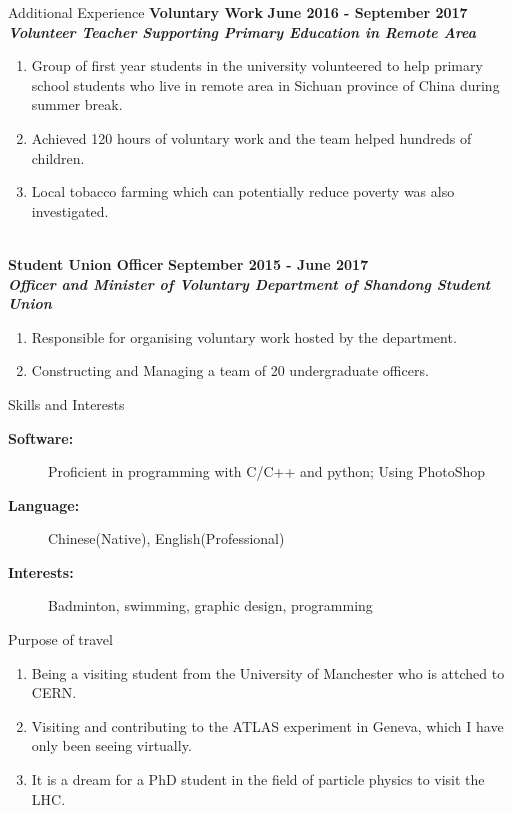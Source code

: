 \documentclass{resume} %
\begin{document}
    \begin{rSection}{Additional Experience}
        {\bf Voluntary Work} \hfill {\bf June 2016 - September 2017}\\
        {\bf \em Volunteer Teacher Supporting Primary Education in Remote Area}
        \begin{enumerate}[leftmargin=*,label=$\bullet$]
            \item   Group of first year students in the university volunteered to help primary school students who live in remote area in 
                    Sichuan province of China during summer break.
            \item   Achieved 120 hours of voluntary work and the team helped hundreds of children.
            \item   Local tobacco farming which can potentially reduce poverty was also investigated.
        \end{enumerate} 
        \ \\[0pt]
        {\bf Student Union Officer} \hfill {\bf September 2015 - June 2017}\\
        {\bf \em Officer and Minister of Voluntary Department of Shandong Student Union}
        \begin{enumerate}[leftmargin=*,label=$\bullet$]
            \item   Responsible for organising voluntary work hosted by the department.
            \item   Constructing and Managing a team of 20 undergraduate officers.
        \end{enumerate}
    \end{rSection}

    \begin{rSection}{Skills and Interests}
        \begin{description}
            \item[\bf Software: \ ] Proficient in programming with C/C++ and python; Using PhotoShop
            \item[\bf Language: ] Chinese(Native), English(Professional)
            \item[\bf Interests:\ \ ] Badminton, swimming, graphic design, programming
        \end{description} 
    \end{rSection}

    \begin{rSection}{Purpose of travel}
        \begin{enumerate}[leftmargin=*,label=$\bullet$]
            \item   Being a visiting student from the University of Manchester who is attched to CERN.
            \item   Visiting and contributing to the ATLAS experiment in Geneva,  which I have only been seeing virtually.
            \item   It is a dream for a PhD student in the field of particle physics to visit the LHC.  
        \end{enumerate} 
    \end{rSection}
\end{document}
